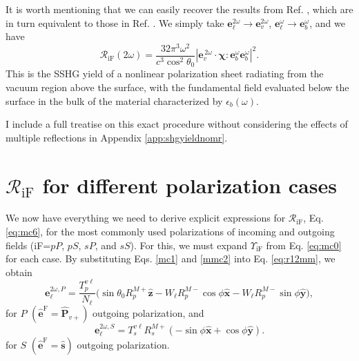 It is worth mentioning that we can easily recover the results from Ref.
\cite{mizrahiJOSA88}, which are in turn equivalent to those in Ref.
\cite{sipePRB87}. We simply take
$\mathbf{e}^{2\omega}_{\ell}\to\mathbf{e}^{2\omega}_{v}$,
$\mathbf{e}^{\omega}_{\ell}\to\mathbf{e}^{\omega}_{b}$, and we have
\begin{equation}\label{eq:m69}
\mathcal{R}_{\mathrm{iF}}(2\omega) =
\frac{32\pi^{3}\omega^{2}}{c^{3}\cos^{2}\theta_{0}}
\left\vert\mathbf{e}^{\,2\omega}_{v}\cdot
\boldsymbol{\chi}:\mathbf{e}^{\omega}_{b}\mathbf{e}^{\omega}_{b}
\right\vert^{2}.
\end{equation}
This is the SSHG yield  of a nonlinear polarization sheet radiating from the
vacuum region above the surface, with the fundamental field evaluated below the
surface in the bulk of the material characterized by $\epsilon_{b}(\omega)$.

I include a full treatise on this exact procedure without considering the
effects of multiple reflections in Appendix \ref{app:shgyieldnomr}.



\section{\texorpdfstring{$\mathcal{R}_{\mathrm{iF}}$}{R} for different
polarization cases}\label{sec:rcases}

We now have everything we need to derive explicit expressions for
$\mathcal{R}_{\mathrm{iF}}$, Eq. \eqref{eq:mc6}, for the most commonly used
polarizations of incoming and outgoing fields (iF=$pP$, $pS$, $sP$, and $sS$).
For this, we must expand $\Upsilon_{\mathrm{iF}}$ from Eq. \eqref{eq:mc0} for
each case. By substituting Eqs. \eqref{mc1} and \eqref{mmc2} into Eq.
\eqref{eq:r12mm}, we obtain
\begin{equation}\label{eq:e2wpmr}
\mathbf{e}^{2\omega,P}_{\ell} =
\frac{T^{v\ell}_{p}}{N_{\ell}}
\big(
  \sin\theta_{0}R^{M+}_{p}\hat{\mathbf{z}}
- W_{\ell}R^{M-}_{p}\cos\phi\hat{\mathbf{x}}
- W_{\ell}R^{M-}_{p}\sin\phi\hat{\mathbf{y}}
\big),
\end{equation}
for $P$ $(\hat{\mathbf{e}}^{\mathrm{F}} = \hat{\mathbf{P}}_{v+})$ outgoing
polarization, and
\begin{equation}\label{eq:e2wsmr}
\mathbf{e}^{2\omega,S}_{\ell} =
T_{s}^{v\ell}R^{M+}_{s}
\left(
- \sin\phi\hat{\mathbf{x}}
+ \cos\phi\hat{\mathbf{y}}
\right).
\end{equation}
for $S$ $(\hat{\mathbf{e}}^{\mathrm{F}}=\hat{\mathbf{s}})$ outgoing polarization.

